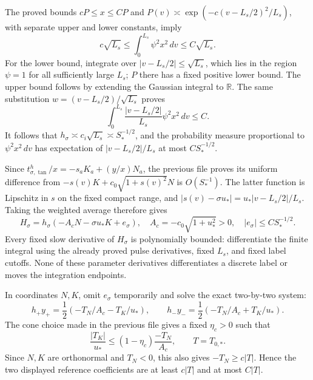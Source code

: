\documentclass[10pt,a4paper]{article}
\begin{document}
The proved bounds \(cP\le x\le CP\) and \(P(v)\asymp\exp(-c(v-L_s/2)^2/L_s)\), with separate upper and lower constants, imply \[
c\sqrt{L_s}\le\int_0^{L_s}\psi^2x^2\,dv\le C\sqrt{L_s}.
\] For the lower bound, integrate over \(|v-L_s/2|\le\sqrt{L_s}\), which lies in the region \(\psi=1\) for all sufficiently large \(L_s\); \(P\) there has a fixed positive lower bound. The upper bound follows by extending the Gaussian integral to \(\mathbb R\). The same substitution \(w=(v-L_s/2)/\sqrt{L_s}\) proves \[
\int_0^{L_s}\frac{|v-L_s/2|}{L_s}\psi^2x^2\,dv\le C.
\] It follows that \(h_\sigma\asymp c_i\sqrt{L_s}\asymp S_*^{-1/2}\), and the probability measure proportional to \(\psi^2x^2\,dv\) has expectation of \(|v-L_s/2|/L_s\) at most \(CS_*^{-1/2}\).

Since \(t_{\sigma,\tan}^h/x=-s_aK_a+(y/x)N_a\), the previous file proves its uniform difference from \(-s(v)K+c_0\sqrt{1+s(v)^2}N\) is \(O(S_*^{-1})\). The latter function is Lipschitz in \(s\) on the fixed compact range, and \(|s(v)-\sigma u_*|=u_*|v-L_s/2|/L_s\). Taking the weighted average therefore gives \[
H_\sigma=h_\sigma(-A_cN-\sigma u_*K+e_\sigma),\quad
A_c=-c_0\sqrt{1+u_*^2}>0,\quad |e_\sigma|\le CS_*^{-1/2}.
\] Every fixed slow derivative of \(H_\sigma\) is polynomially bounded: differentiate the finite integral using the already proved pulse derivatives, fixed \(L_s\), and fixed label cutoffs. None of these parameter derivatives differentiates a discrete label or moves the integration endpoints.

In coordinates \(N,K\), omit \(e_\sigma\) temporarily and solve the exact two-by-two system: \[
h_+y_+=\frac12(-T_N/A_c-T_K/u_*),\qquad
h_-y_-=\frac12(-T_N/A_c+T_K/u_*).
\] The cone choice made in the previous file gives a fixed \(\eta_c>0\) such that \[
\frac{|T_K|}{u_*}\le(1-\eta_c)\frac{-T_N}{A_c},
\qquad T=T_{0,*}.
\] Since \(N,K\) are orthonormal and \(T_N<0\), this also gives \(-T_N\ge c|T|\). Hence the two displayed reference coefficients are at least \(c|T|\) and at most \(C|T|\).
\end{document}
